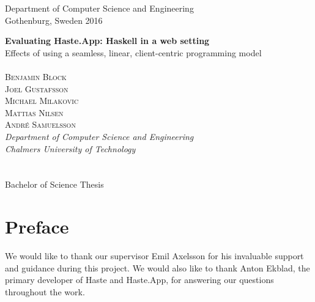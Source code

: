 \documentclass[a4paper]{article}
\begin{document}
\vfill

Department of Computer Science and Engineering\\
Gothenburg, Sweden 2016


\normalsize



\vfill

\newpage
{\Large \textbf{Evaluating Haste.App: Haskell in a web setting}}\\
{\Large Effects of using a seamless, linear, client-centric programming model}\\
\\
{ \textsc{Benjamin Block}} \setlength{\parskip}{2.9cm}\\
{ \textsc{Joel Gustafsson}} \setlength{\parskip}{2.9cm}\\
{ \textsc{Michael Milakovic}} \setlength{\parskip}{2.9cm}\\
{ \textsc{Mattias Nilsen}} \setlength{\parskip}{2.9cm}\\
{ \textsc{André Samuelsson}} \setlength{\parskip}{2.9cm}\\
\textit{
Department of Computer Science and Engineering\\
Chalmers University of Technology \setlength{\parskip}{0.5cm} \\
\setlength{\parskip}{0cm}}\\\\
Bachelor of Science Thesis

\thispagestyle{plain}			%
\setlength{\parskip}{1em}
\section*{Preface}
We would like to thank our supervisor Emil Axelsson for his invaluable support and guidance during this project. We would also like to thank Anton Ekblad, the primary developer of Haste and Haste.App, for answering our questions throughout the work.
\end{document}

